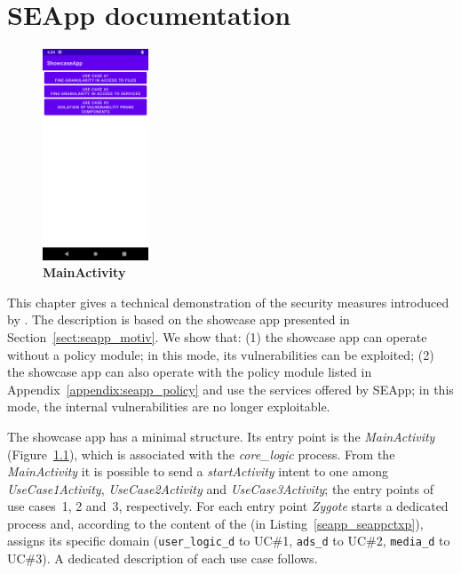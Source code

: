 \chapter[Seapp documentation]{SEApp documentation}\label{appendix:seapp_analysis}

\vspace{-1.8em}
\begin{figure}
  \vspace{-1.5em}
	\begin{center}
          \includegraphics[width=0.28\textwidth]{chapters/seapp/figs/ae/MainActivity.png}
        \end{center}
	\caption{ \bf MainActivity}
	\label{fig:seapp_mainactivity_view}
      \end{figure}
      
\vspace{-1em}
This chapter gives a technical demonstration of the security measures
introduced by \pap. The description is based on the showcase app
presented in Section~\ref{sect:seapp_motiv}. We show that: (1) the
showcase app can operate without a policy module; in this mode, its
vulnerabilities can be exploited; (2) the showcase app can also
operate with the policy module listed in
Appendix~\ref{appendix:seapp_policy} and use the services offered by
SEApp; in this mode, the internal vulnerabilities are no longer
exploitable.

The showcase app has a minimal structure. Its entry point is the {\em
  MainActivity} (Figure~\ref{fig:seapp_mainactivity_view}), which is associated with the {\em core\_logic}
process. From the {\em MainActivity} it is possible to send a {\em
  startActivity} intent to one among {\em UseCase1Activity}, {\em
  UseCase2Activity} and {\em UseCase3Activity}; the entry points of
use cases~1, 2 and~3, respectively. For each entry point {\em Zygote}
starts a dedicated process and, according to the content of the
\seappcontexts (in Listing~\ref{seapp_seappctxp}), assigns its
specific domain ({\tt user\_logic\_d} to UC\#1, {\tt ads\_d} to UC\#2,
{\tt media\_d} to UC\#3).  A dedicated description of each use case
follows.


